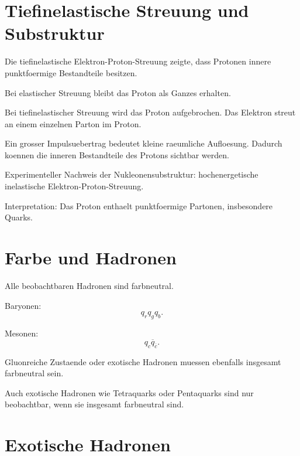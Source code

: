 \section{Tiefinelastische Streuung und Substruktur}

Die tiefinelastische Elektron-Proton-Streuung zeigte, dass Protonen innere
punktfoermige Bestandteile besitzen.

\begin{conceptbox}
Bei elastischer Streuung bleibt das Proton als Ganzes erhalten.

Bei tiefinelastischer Streuung wird das Proton aufgebrochen.
Das Elektron streut an einem einzelnen Parton im Proton.
\end{conceptbox}

\begin{notebox}
Ein grosser Impulsuebertrag bedeutet kleine raeumliche Aufloesung.
Dadurch koennen die inneren Bestandteile des Protons sichtbar werden.
\end{notebox}

\begin{examtipbox}
Experimenteller Nachweis der Nukleonensubstruktur:
hochenergetische inelastische Elektron-Proton-Streuung.

Interpretation:
Das Proton enthaelt punktfoermige Partonen, insbesondere Quarks.
\end{examtipbox}

\section{Farbe und Hadronen}

\begin{conceptbox}
Alle beobachtbaren Hadronen sind farbneutral.

Baryonen:
\[
    q_r q_g q_b.
\]

Mesonen:
\[
    q_c\overline{q}_{\overline{c}}.
\]

Gluonreiche Zustaende oder exotische Hadronen muessen ebenfalls insgesamt
farbneutral sein.
\end{conceptbox}

\begin{notebox}
Auch exotische Hadronen wie Tetraquarks oder Pentaquarks sind nur beobachtbar,
wenn sie insgesamt farbneutral sind.
\end{notebox}

\section{Exotische Hadronen}

